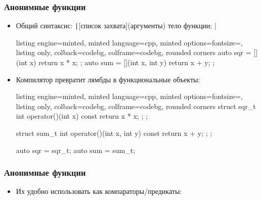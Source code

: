 \documentclass[10pt]{beamer}
\begin{document}
\begin{frame}[fragile]
\frametitle{Анонимные функции}
\begin{itemize}
\item Общий синтаксис: \texttt|[список захвата](аргументы){ тело функции; }|
\pause
{}
\begin{tcblisting}{listing engine=minted, minted language=cpp, minted options={fontsize=\scriptsize}, listing only, colback=codebg, colframe=codebg, rounded corners}
auto sqr = [](int x){ return x * x; };
auto sum = [](int x, int y){ return x + y; };
\end{tcblisting}
\pause
\item Компилятор превратит лямбды в функциональные объекты:
\begin{tcblisting}{listing engine=minted, minted language=cpp, minted options={fontsize=\scriptsize}, listing only, colback=codebg, colframe=codebg, rounded corners}
struct sqr_t {
  int operator()(int x) const { return x * x; };
};

struct sum_t {
  int operator()(int x, int y) const { return x + y; };
};

auto sqr = sqr_t{};
auto sum = sum_t{};
\end{tcblisting}
\end{itemize}
\end{frame}

\begin{frame}[fragile]
\frametitle{Анонимные функции}
\begin{itemize}
\item Их удобно использовать как компараторы/предикаты:
\end{itemize}
\end{frame}
\end{document}
